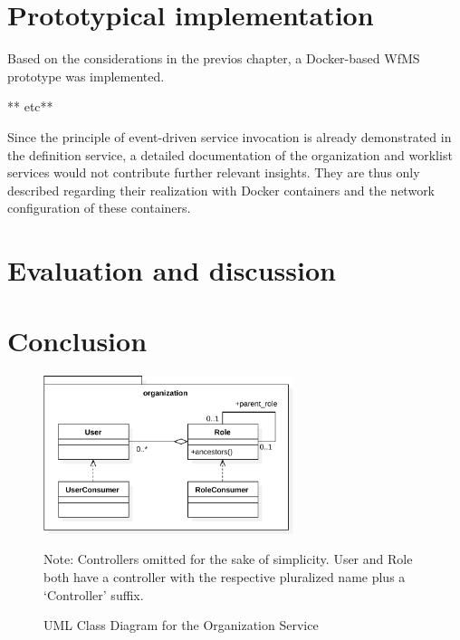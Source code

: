 \documentclass[language=english,noinputenc]{wiwwuwordrprt}
\begin{document}

  \chapter{Prototypical implementation} %
    \label{cha:implementation}

    Based on the considerations in the previos chapter, a Docker-based \ac{WfMS} prototype was implemented.

    ** etc**

    Since the principle of event-driven service invocation is already demonstrated in the definition service, a detailed documentation of the organization and worklist services would not contribute further relevant insights. They are thus only described regarding their realization with Docker containers and the network configuration of these containers.

    

  \chapter{Evaluation and discussion} %
    \label{cha:evaluation}
    

  \chapter{Conclusion} %
    \label{cha:conclusion}
    

  

  \appendix

  \renewcommand\listingscaption{Lis.}
  \captionsetup[listing]{labelformat=simple}


    \begin{figure}[htbp]
      \centering
      \includegraphics[width=0.65\textwidth]{content/images/class_diagram_organization-crop.pdf}
      \caption*{\scriptsize Note: Controllers omitted for the sake of simplicity. User and Role both have a controller with the respective pluralized name plus a `Controller' suffix.}
      \caption{UML Class Diagram for the Organization Service}
      \label{fig:uml_class_diagram_organization}
    \end{figure}
\end{document}
